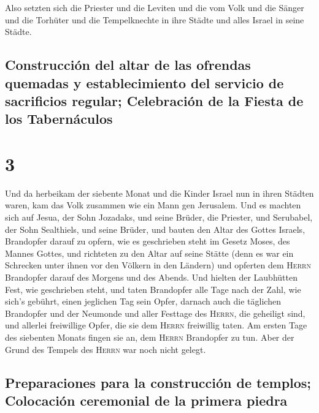  Also setzten sich die Priester und die Leviten und die
vom Volk und die Sänger und die Torhüter und die Tempelknechte in ihre
Städte und alles Israel in seine Städte.

\hypertarget{construcciuxf3n-del-altar-de-las-ofrendas-quemadas-y-establecimiento-del-servicio-de-sacrificios-regular-celebraciuxf3n-de-la-fiesta-de-los-tabernuxe1culos}{%
\subsection{Construcción del altar de las ofrendas quemadas y
establecimiento del servicio de sacrificios regular; Celebración de la
Fiesta de los
Tabernáculos}\label{construcciuxf3n-del-altar-de-las-ofrendas-quemadas-y-establecimiento-del-servicio-de-sacrificios-regular-celebraciuxf3n-de-la-fiesta-de-los-tabernuxe1culos}}

\hypertarget{section-2}{%
\section{3}\label{section-2}}

 Und da herbeikam der siebente Monat und die Kinder Israel
nun in ihren Städten waren, kam das Volk zusammen wie ein Mann gen
Jerusalem.  Und es machten sich auf Jesua, der Sohn
Jozadaks, und seine Brüder, die Priester, und Serubabel, der Sohn
Sealthiels, und seine Brüder, und bauten den Altar des Gottes Israels,
Brandopfer darauf zu opfern, wie es geschrieben steht im Gesetz Moses,
des Mannes Gottes,  und richteten zu den Altar auf seine
Stätte (denn es war ein Schrecken unter ihnen vor den Völkern in den
Ländern) und opferten dem \textsc{Herrn} Brandopfer darauf des Morgens
und des Abends.  Und hielten der Laubhütten Fest, wie
geschrieben steht, und taten Brandopfer alle Tage nach der Zahl, wie
sich's gebührt, einen jeglichen Tag sein Opfer,  darnach
auch die täglichen Brandopfer und der Neumonde und aller Festtage des
\textsc{Herrn}, die geheiligt sind, und allerlei freiwillige Opfer, die
sie dem \textsc{Herrn} freiwillig taten.  Am ersten Tage
des siebenten Monats fingen sie an, dem \textsc{Herrn} Brandopfer zu
tun. Aber der Grund des Tempels des \textsc{Herrn} war noch nicht
gelegt.

\hypertarget{preparaciones-para-la-construcciuxf3n-de-templos-colocaciuxf3n-ceremonial-de-la-primera-piedra}{%
\subsection{Preparaciones para la construcción de templos; Colocación
ceremonial de la primera
piedra}\label{preparaciones-para-la-construcciuxf3n-de-templos-colocaciuxf3n-ceremonial-de-la-primera-piedra}}

